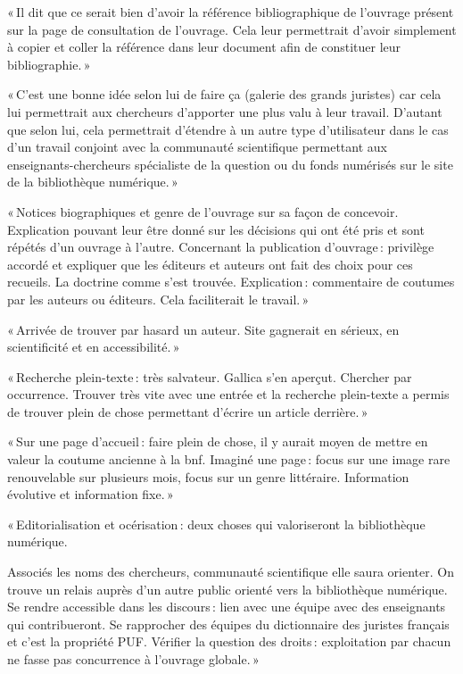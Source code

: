 « Il dit que ce serait bien d’avoir la référence bibliographique de l’ouvrage présent sur la page de consultation de l’ouvrage. Cela leur permettrait d’avoir simplement à copier et coller la référence dans leur document afin de constituer leur bibliographie. » 

« C’est une bonne idée selon lui de faire ça (galerie des grands juristes) car cela lui permettrait aux chercheurs d’apporter une plus valu à leur travail. D’autant que selon lui, cela permettrait d’étendre à un autre type d’utilisateur dans le cas d’un travail conjoint avec la communauté scientifique permettant aux enseignants-chercheurs spécialiste de la question ou du fonds numérisés sur le site de la bibliothèque numérique. »  

« Notices biographiques et genre de l’ouvrage sur sa façon de concevoir. Explication pouvant leur être donné sur les décisions qui ont été pris et sont répétés d’un ouvrage à l’autre. Concernant la publication d’ouvrage : privilège accordé et expliquer que les éditeurs et auteurs ont fait des choix pour ces recueils. La doctrine comme s’est trouvée. Explication : commentaire de coutumes par les auteurs ou éditeurs. Cela faciliterait le travail. » 

« Arrivée de trouver par hasard un auteur. Site gagnerait en sérieux, en scientificité et en accessibilité. » 

« Recherche plein-texte : très salvateur. Gallica s’en aperçut. Chercher par occurrence. Trouver très vite avec une entrée et la recherche plein-texte a permis de trouver plein de chose permettant d’écrire un article derrière. » 

« Sur une page d’accueil : faire plein de chose, il y aurait moyen de mettre en valeur la coutume ancienne à la bnf. Imaginé une page : focus sur une image rare renouvelable sur plusieurs mois, focus sur un genre littéraire. Information évolutive et information fixe. » 

« Editorialisation et océrisation : deux choses qui valoriseront la bibliothèque numérique. 

Associés les noms des chercheurs, communauté scientifique elle saura orienter. On trouve un relais auprès d’un autre public orienté vers la bibliothèque numérique. Se rendre accessible dans les discours : lien avec une équipe avec des enseignants qui contribueront. Se rapprocher des équipes du dictionnaire des juristes français et c’est la propriété PUF. Vérifier la question des droits : exploitation par chacun ne fasse pas concurrence à l’ouvrage globale. »  

